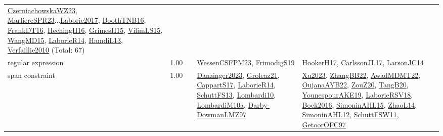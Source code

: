 {\begin{longtable}{p{3cm}r>{\raggedright\arraybackslash}p{6cm}>{\raggedright\arraybackslash}p{6cm}>{\raggedright\arraybackslash}p{8cm}}
\hyperref[detail:CzerniachowskaWZ23]{CzerniachowskaWZ23}, \hyperref[detail:MarliereSPR23]{MarliereSPR23}...\hyperref[detail:Laborie2017]{Laborie2017}, \hyperref[detail:BoothTNB16]{BoothTNB16}, \hyperref[detail:FrankDT16]{FrankDT16}, \hyperref[detail:HechingH16]{HechingH16}, \hyperref[detail:GrimesH15]{GrimesH15}, \hyperref[detail:VilimLS15]{VilimLS15}, \hyperref[detail:WangMD15]{WangMD15}, \hyperref[detail:LaborieR14]{LaborieR14}, \hyperref[detail:HamdiL13]{HamdiL13}, \hyperref[detail:Verfaillie2010]{Verfaillie2010} (Total: 67)\\
\index{regular expression}\index{Constraints!regular expression}regular expression &  1.00 &  & \hyperref[detail:WessenCSFPM23]{WessenCSFPM23}, \hyperref[detail:FrimodigS19]{FrimodigS19} & \hyperref[detail:HookerH17]{HookerH17}, \hyperref[detail:CarlssonJL17]{CarlssonJL17}, \hyperref[detail:LarsonJC14]{LarsonJC14}\\
\index{span constraint}\index{Constraints!span constraint}span constraint &  1.00 &  & \hyperref[detail:Danzinger2023]{Danzinger2023}, \hyperref[detail:Groleaz21]{Groleaz21}, \hyperref[detail:CappartS17]{CappartS17}, \hyperref[detail:LaborieR14]{LaborieR14}, \hyperref[detail:SchuttFS13]{SchuttFS13}, \hyperref[detail:Lombardi10]{Lombardi10}, \hyperref[detail:LombardiM10a]{LombardiM10a}, \hyperref[detail:Darby-DowmanLMZ97]{Darby-DowmanLMZ97} & \hyperref[detail:Xu2023]{Xu2023}, \hyperref[detail:ZhangBB22]{ZhangBB22}, \hyperref[detail:AwadMDMT22]{AwadMDMT22}, \hyperref[detail:OujanaAYB22]{OujanaAYB22}, \hyperref[detail:ZouZ20]{ZouZ20}, \hyperref[detail:TangB20]{TangB20}, \hyperref[detail:YounespourAKE19]{YounespourAKE19}, \hyperref[detail:LaborieRSV18]{LaborieRSV18}, \hyperref[detail:Boek2016]{Boek2016}, \hyperref[detail:SimoninAHL15]{SimoninAHL15}, \hyperref[detail:ZhaoL14]{ZhaoL14}, \hyperref[detail:SimoninAHL12]{SimoninAHL12}, \hyperref[detail:SchuttFSW11]{SchuttFSW11}, \hyperref[detail:GetoorOFC97]{GetoorOFC97}\\

\end{longtable}}
